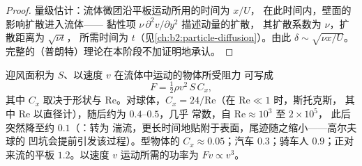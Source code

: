 \begin{proof}
量级估计：流体微团沿平板运动所用的时间为 $x/U$，
在此时间内，壁面的影响扩散进入流体——
黏性项 $\nu\,\partial^2v/\partial y^2$ 描述动量的扩散，
其扩散系数为 $\nu$，扩散距离为 $\sqrt{\nu t}$，
所需时间为 $t$（见\cref{ch:b2:particle-diffusion}）。由此 $\delta \sim \sqrt{\nu x
/U}$。完整的（普朗特）理论在本阶段不加证明地承认。
\end{proof}

\begin{proposition}[高雷诺数下的阻力]\label{prop:b2:viscous-flows:drag}
迎风面积为 $S$、以速度 $v$ 在流体中运动的物体所受阻力
可写成
\[
F = \tfrac12\rho v^2\,S\,C_x ,
\]
其中\emph{} $C_x$ 取决于形状与
$\mathrm{Re}$。对球体，$C_x = 24/\mathrm{Re}$（在 $\mathrm{Re} \ll 1$ 时，斯托克斯，
其中 $\mathrm{Re}$ 以直径计），随后约为 $0.4$--$0.5$，几乎
常数，自 $\mathrm{Re} \approx 10^3$ 至 $2 \times 10^5$，
此后突然降至约 $0.1$（\emph{}：转为
湍流，更长时间地贴附于表面，尾迹随之缩小——高尔夫球的
凹坑会提前引发该过程）。型物体的
$C_x \approx 0.05$；汽车 $0.3$；骑车人 $0.9$；正对来流的平板
$1.2$。以速度 $v$ 运动所需的功率为 $Fv \propto v^3$。
\end{proposition}
\admitted

